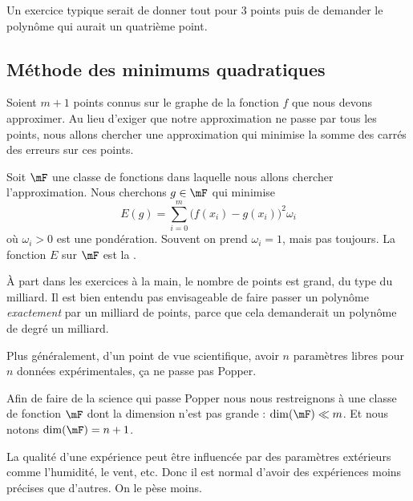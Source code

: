 Un exercice typique serait de donner tout pour \( 3\) points puis de demander le polynôme qui aurait un quatrième point.

\subsection{Méthode des minimums quadratiques}

Soient \( m+1\) points connus sur le graphe de la fonction \( f\) que nous devons approximer. Au lieu d'exiger que notre approximation ne passe par tous les points, nous allons chercher une approximation qui minimise la somme des carrés des erreurs sur ces points.

Soit \( \mF\) une classe de fonctions dans laquelle nous allons chercher l'approximation. Nous cherchons \( g\in \mF\) qui minimise
\begin{equation}    \label{EQooJGQVooKwZZVJ}
	E(g)= \sum_{i=0}^m \big( f(x_i)-g(x_i) \big)^2\omega_i
\end{equation}
où \( \omega_i>0\) est une pondération. Souvent on prend \( \omega_i=1\), mais pas toujours. La fonction \( E\) sur \( \mF\) est la .

\begin{normaltext}
	À part dans les exercices à la main, le nombre de points est grand, du type du milliard. Il est bien entendu pas envisageable de faire passer un polynôme \emph{exactement} par un milliard de points, parce que cela demanderait un polynôme de degré un milliard.

	Plus généralement, d'un point de vue scientifique, avoir \( n\) paramètres libres pour \( n\) données expérimentales, ça ne passe pas Popper.

	Afin de faire de la science qui passe Popper nous nous restreignons à une classe de fonction \( \mF\) dont la dimension n'est pas grande : \( \dim( \mF)\ll m\). Et nous notons \( \dim(\mF)=n+1\).
\end{normaltext}

\begin{example}
	La qualité d'une expérience peut être influencée par des paramètres extérieurs comme l'humidité, le vent, etc. Donc il est normal d'avoir des expériences moins précises que d'autres. On le pèse moins.
\end{example}

